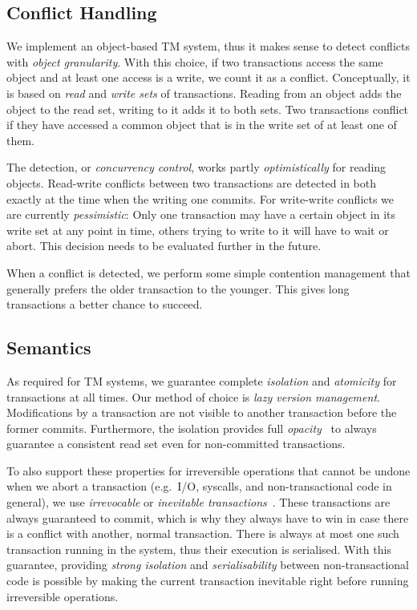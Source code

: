 \documentclass{sigplanconf}
\begin{document}
\subsection{Conflict Handling}

We implement an object-based TM system, thus it makes sense to detect
conflicts with \emph{object granularity}. With this choice, if two
transactions access the same object and at least one access is a
write, we count it as a conflict. Conceptually, it is based on
\emph{read} and \emph{write sets} of transactions. Reading from an
object adds the object to the read set, writing to it adds it to both
sets. Two transactions conflict if they have accessed a common object
that is in the write set of at least one of them.

The detection, or \emph{concurrency control}, works partly
\emph{optimistically} for reading objects. Read-write conflicts
between two transactions are detected in both exactly at the time when
the writing one commits. For write-write conflicts we are currently
\emph{pessimistic}: Only one transaction may have a certain object in
its write set at any point in time, others trying to write to it will
have to wait or abort. This decision needs to be evaluated further
in the future.

When a conflict is detected, we perform some simple contention
management that generally prefers the older transaction to the younger.
This gives long transactions a better chance to succeed.

\subsection{Semantics}

As required for TM systems, we guarantee complete \emph{isolation} and
\emph{atomicity} for transactions at all times. Our method of choice
is \emph{lazy version management}. Modifications by a transaction are
not visible to another transaction before the former commits.
Furthermore, the isolation provides full
\emph{opacity}~\cite{guerraoui08} to always guarantee a consistent
read set even for non-committed transactions.

To also support these properties for irreversible operations that
cannot be undone when we abort a transaction (e.g.\ I/O, syscalls, and
non-transactional code in general), we use \emph{irrevocable} or
\emph{inevitable transactions}~\cite{blundell06,spear08}. These transactions are always
guaranteed to commit, which is why they always have to win in case
there is a conflict with another, normal transaction. There is always
at most one such transaction running in the system, thus their
execution is serialised. With this guarantee, providing \emph{strong
isolation} and \emph{serialisability} between non-transactional code
is possible by making the current transaction inevitable right before
running irreversible operations.
\end{document}
